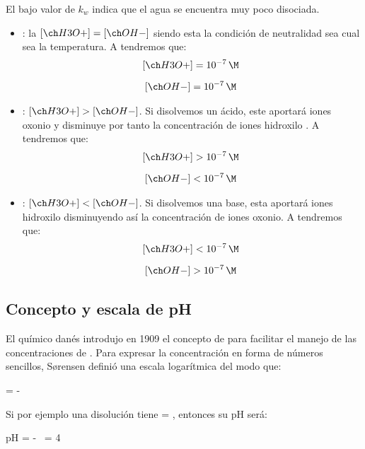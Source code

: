 El bajo valor de \(k_w\) indica que el agua se encuentra muy poco disociada.

\begin{itemize}
    \item {}: la \(\conc{H3O+} = \conc{OH-}\) siendo esta la condición de neutralidad sea cual sea la temperatura.
    A  tendremos que:
    \begin{gather*}
        \conc{H3O+} = \concentracion[m]{e-7}\separ
        \conc{OH-} = \concentracion[m]{e-7}
    \end{gather*}
    \item {}: \(\conc{H3O+} > \conc{OH-}\).
    Si disolvemos un ácido, este aportará iones oxonio  y disminuye por tanto la concentración de iones hidroxilo . A  tendremos que:
    \begin{gather*}
        \conc{H3O+} > \concentracion[m]{e-7}\separ
        \conc{OH-} < \concentracion[m]{e-7}
    \end{gather*}
    \item {}: \(\conc{H3O+} < \conc{OH-}\).
    Si disolvemos una base, esta aportará iones hidroxilo disminuyendo así la concentración de iones oxonio.
    A  tendremos que:
    \begin{gather*}
        \conc{H3O+} < \concentracion[m]{e-7}\separ
        \conc{OH-} > \concentracion[m]{e-7}
    \end{gather*}
\end{itemize}

\subsection{Concepto y escala de pH}\label{subsec:concepto-y-escala-de-ph}

El químico danés  introdujo en \num{1909} el concepto de  para facilitar el manejo de las concentraciones de .
Para expresar la concentración en forma de números sencillos, S\o{}rensen definió una escala logarítmica del modo que:
\begin{centeredequation}
    \pH = -\log\ \label{eq:pH}
\end{centeredequation}


Si por ejemplo una disolución tiene  = , entonces su pH será:
\begin{centeredequation}
    pH = -\log\  = 4
\end{centeredequation}

